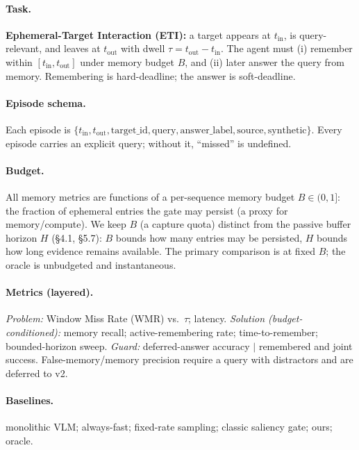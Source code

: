 \documentclass[11pt,a4paper]{article}
\begin{document}
\paragraph{Task.} \textbf{Ephemeral-Target Interaction (ETI):} a target appears at $t_{\mathrm{in}}$, is query-relevant, and leaves at $t_{\mathrm{out}}$ with dwell $\tau=t_{\mathrm{out}}-t_{\mathrm{in}}$. The agent must (i) remember within $[t_{\mathrm{in}},t_{\mathrm{out}}]$ under memory budget $B$, and (ii) later answer the query from memory. Remembering is hard-deadline; the answer is soft-deadline.

\paragraph{Episode schema.} Each episode is $\{t_{\mathrm{in}}, t_{\mathrm{out}}, \text{target\_id}, \text{query}, \text{answer\_label}, \text{source}, \text{synthetic}\}$. Every episode carries an explicit query; without it, ``missed'' is undefined.

\paragraph{Budget.} All memory metrics are functions of a per-sequence memory budget $B\in(0,1]$: the fraction of ephemeral entries the gate may persist (a proxy for memory/compute). We keep $B$ (a capture quota) distinct from the passive buffer horizon $H$ (\S4.1, \S5.7): $B$ bounds how many entries may be persisted, $H$ bounds how long evidence remains available. The primary comparison is at fixed $B$; the oracle is unbudgeted and instantaneous.

\paragraph{Metrics (layered).} \emph{Problem:} Window Miss Rate (WMR) vs.\ $\tau$; latency. \emph{Solution (budget-conditioned):} memory recall; active-remembering rate; time-to-remember; bounded-horizon sweep. \emph{Guard:} deferred-answer accuracy $|$ remembered and joint success. False-memory/memory precision require a query with distractors and are deferred to v2.

\paragraph{Baselines.} monolithic VLM; always-fast; fixed-rate sampling; classic saliency gate; ours; oracle.
\end{document}
